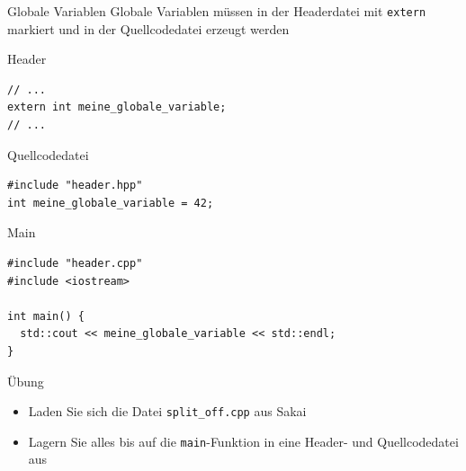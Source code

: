 \documentclass[presentation]{beamer}
\begin{document}
\begin{frame}[label={sec:org5684781},fragile]{Globale Variablen}
 Globale Variablen müssen in der Headerdatei mit {\color{solarizedYellow}\texttt{extern} }markiert und
in der Quellcodedatei erzeugt werden
\begin{block}{Header}
\begin{verbatim}
// ...
extern int meine_globale_variable;
// ...
\end{verbatim}
\end{block}
\begin{block}{Quellcodedatei}
\begin{verbatim}
#include "header.hpp"
int meine_globale_variable = 42;
\end{verbatim}
\end{block}
\begin{block}{Main}
\begin{verbatim}
#include "header.cpp"
#include <iostream>

int main() { 
  std::cout << meine_globale_variable << std::endl; 
}
\end{verbatim}
\end{block}
\end{frame}
\begin{frame}[label={sec:org7330903},fragile]{Übung}
 \begin{itemize}
\item Laden Sie sich die Datei {\color{solarizedYellow}\texttt{split\_off.cpp} }aus Sakai
\item Lagern Sie alles bis auf die {\color{solarizedYellow}\texttt{main}}-Funktion in eine Header- und
Quellcodedatei aus
\end{itemize}
\end{frame}
\end{document}

